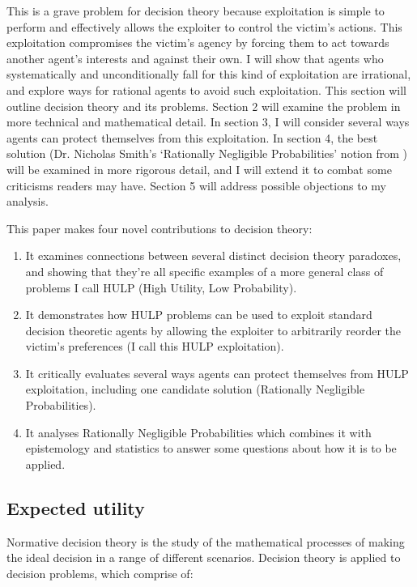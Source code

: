 \documentclass{article}
\begin{document}
This is a grave problem for decision theory because exploitation is simple to perform and effectively allows the exploiter to control the victim's actions. This exploitation compromises the victim's agency by forcing them to act towards another agent's interests and against their own. I will show that agents who systematically and unconditionally fall for this kind of exploitation are irrational, and explore ways for rational agents to avoid such exploitation. This section will outline decision theory and its problems. Section 2 will examine the problem in more technical and mathematical detail. In section 3, I will consider several ways agents can protect themselves from this exploitation. In section 4, the best solution (Dr. Nicholas Smith's `Rationally Negligible Probabilities' notion from \citet{smith2014evaluative}) will be examined in more rigorous detail, and I will extend it to combat some criticisms readers may have. Section 5 will address possible objections to my analysis.

This paper makes four novel contributions to decision theory:

\begin{enumerate}
\item It examines connections between several distinct decision theory paradoxes, and showing that they're all specific examples of a more general class of problems I call HULP (High Utility, Low Probability).
\item It demonstrates how HULP problems can be used to exploit standard decision theoretic agents by allowing the exploiter to arbitrarily reorder the victim's preferences (I call this HULP exploitation).
\item It critically evaluates several ways agents can protect themselves from HULP exploitation, including one candidate solution (Rationally Negligible Probabilities).
\item It analyses Rationally Negligible Probabilities which combines it with epistemology and statistics to answer some questions about how it is to be applied.
\end{enumerate}

\subsection{Expected utility}
Normative decision theory is the study of the mathematical processes of making the ideal decision in a range of different scenarios. Decision theory is applied to decision problems, which comprise of:
\end{document}

